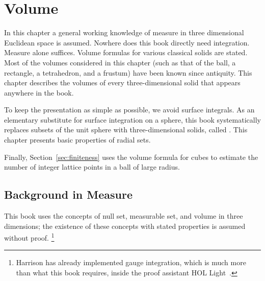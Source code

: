 


\chapter{Volume}\label{chapter:volume}

\begin{summary}
  In this chapter a general working knowledge of measure in three
  dimensional Euclidean space is assumed.  Nowhere does this book directly need
   integration.  Measure alone suffices.  Volume formulas
  for various classical solids are stated.  Most of the volumes
  considered in this chapter (such as that of the ball, a rectangle, a
  tetrahedron, and a frustum) have been known since antiquity.  This chapter
  describes the volumes of every
  three-dimensional solid that appears anywhere in the book.

  To keep the presentation as simple as possible,  we avoid surface integrals.
  As an elementary substitute for surface
  integration on a sphere, this book systematically replaces
  subsets of the unit sphere with three-dimensional solids, called .  This chapter presents basic properties of radial sets.

  Finally, Section~\ref{sec:finiteness} uses the volume formula for cubes to estimate the number
  of integer lattice points in a ball of large radius.
\end{summary}

\section{Background in Measure}
%


This book uses the concepts of null set, measurable set, and volume in
three dimensions; the existence of these concepts with stated
properties is assumed without proof. \footnote{Harrison has already
  implemented gauge integration, which is much more than what this
  book requires, inside the proof assistant HOL Light~\cite{HHMNOZ}.}




